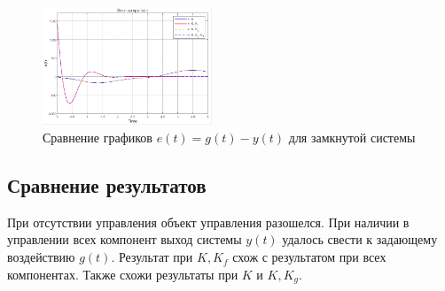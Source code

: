 \documentclass[a4paper, 12pt]{article}
\begin{document}
    \begin{figure}[H]
        \centering
        \includegraphics[width=0.45\textwidth]{1task_e.png}
        \caption{Сравнение графиков $e(t)=g(t)-y(t)$ для замкнутой системы}
        \label{fig:1task_e}
    \end{figure}


    \subsection{Сравнение результатов}
    При отсутствии управления объект управления разошелся.
    При наличии в управлении всех компонент выход системы $y(t)$
    удалось свести к задающему воздействию $g(t)$. Результат
    при $K,K_f$ схож с результатом при всех компонентах.
    Также схожи результаты при $K$ и $K,K_g$.
\end{document}
